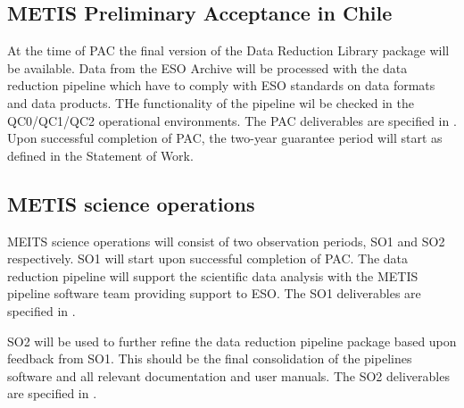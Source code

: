 \subsection{METIS Preliminary Acceptance in Chile}
\label{ssec:pae_chile}

At the time of PAC the final version of the Data Reduction Library package will be available. Data from the ESO Archive will be processed with the data reduction pipeline  which have to comply with ESO standards on data formats and data products. THe functionality of the pipeline wil be checked in the QC0/QC1/QC2 operational environments. The PAC deliverables are specified in \cite{1618}. Upon successful completion of PAC, the two-year guarantee period will start as defined in the Statement of Work.

\subsection{METIS science operations}
\label{ssec:sciops}

MEITS science operations will consist of two observation periods, SO1 and SO2 respectively. SO1 will start upon successful completion of PAC. The data reduction pipeline will support the scientific data analysis with the METIS pipeline software team providing support to ESO. The SO1 deliverables are specified in \cite{1618}.

SO2 will be used to further refine the data reduction pipeline package based upon feedback from SO1. This should be the final consolidation of the pipelines software and all relevant documentation and user manuals. The SO2 deliverables are specified in \cite{1618}.

